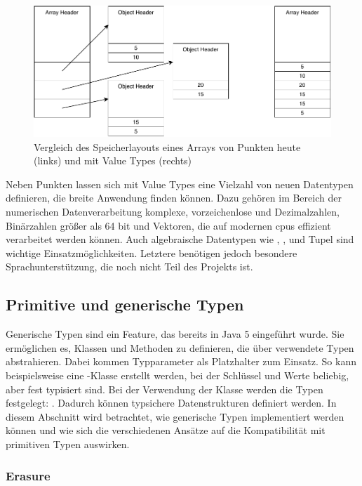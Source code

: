 \begin{figure}
    \centering
    \includegraphics[width=\textwidth]{img/memory-usage.pdf}
    \vspace{-3ex}
    \caption{Vergleich des Speicherlayouts eines Arrays von Punkten heute (links) und mit Value Types (rechts)}
    \label{fig:memory-usage}
\end{figure}

Neben Punkten lassen sich mit Value Types eine Vielzahl von neuen Datentypen definieren, die breite Anwendung finden können.
Dazu gehören im Bereich der numerischen Datenverarbeitung komplexe, vorzeichenlose und Dezimalzahlen, Binärzahlen größer als 64 bit und Vektoren, die auf modernen \acp{cpu} effizient verarbeitet werden können.
Auch algebraische Datentypen wie , ,  und Tupel sind wichtige Einsatzmöglichkeiten.
Letztere benötigen jedoch besondere Sprachunterstützung, die noch nicht Teil des Projekts ist.

\subsection{Primitive und generische Typen}\label{subsec:primitive-generics}

Generische Typen sind ein Feature, das bereits in Java 5 eingeführt wurde.
Sie ermöglichen es, Klassen und Methoden zu definieren, die über verwendete Typen abstrahieren.
Dabei kommen Typparameter als Platzhalter zum Einsatz.
So kann beispielsweise eine -Klasse erstellt werden, bei der Schlüssel und Werte beliebig, aber fest typisiert sind.
Bei der Verwendung der Klasse werden die Typen festgelegt: .
Dadurch können typsichere Datenstrukturen definiert werden.
In diesem Abschnitt wird betrachtet, wie generische Typen implementiert werden können und wie sich die verschiedenen Ansätze auf die Kompatibilität mit primitiven Typen auswirken.

\subsubsection{Erasure}

